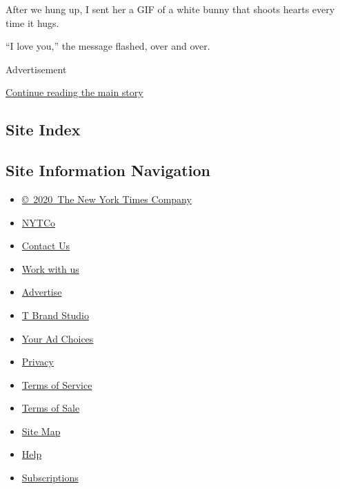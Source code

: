 After we hung up, I sent her a GIF of a white bunny that shoots hearts
every time it hugs.

``I love you,'' the message flashed, over and over.

Advertisement

\protect\hyperlink{after-bottom}{Continue reading the main story}

\hypertarget{site-index}{%
\subsection{Site Index}\label{site-index}}

\hypertarget{site-information-navigation}{%
\subsection{Site Information
Navigation}\label{site-information-navigation}}

\begin{itemize}
\tightlist
\item
  \href{https://help.nytimes3xbfgragh.onion/hc/en-us/articles/115014792127-Copyright-notice}{©~2020~The
  New York Times Company}
\end{itemize}

\begin{itemize}
\tightlist
\item
  \href{https://www.nytco.com/}{NYTCo}
\item
  \href{https://help.nytimes3xbfgragh.onion/hc/en-us/articles/115015385887-Contact-Us}{Contact
  Us}
\item
  \href{https://www.nytco.com/careers/}{Work with us}
\item
  \href{https://nytmediakit.com/}{Advertise}
\item
  \href{http://www.tbrandstudio.com/}{T Brand Studio}
\item
  \href{https://www.nytimes3xbfgragh.onion/privacy/cookie-policy\#how-do-i-manage-trackers}{Your
  Ad Choices}
\item
  \href{https://www.nytimes3xbfgragh.onion/privacy}{Privacy}
\item
  \href{https://help.nytimes3xbfgragh.onion/hc/en-us/articles/115014893428-Terms-of-service}{Terms
  of Service}
\item
  \href{https://help.nytimes3xbfgragh.onion/hc/en-us/articles/115014893968-Terms-of-sale}{Terms
  of Sale}
\item
  \href{https://spiderbites.nytimes3xbfgragh.onion}{Site Map}
\item
  \href{https://help.nytimes3xbfgragh.onion/hc/en-us}{Help}
\item
  \href{https://www.nytimes3xbfgragh.onion/subscription?campaignId=37WXW}{Subscriptions}
\end{itemize}
